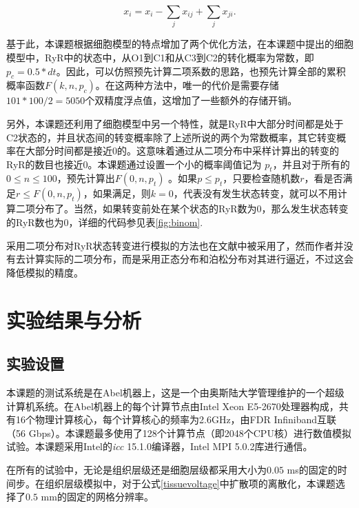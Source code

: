 \begin{equation}
\label{transitNumber}
x_i = x_i - \sum_{j}x_{ij}+\sum_{j}x_{ji}.
\end{equation}

基于此，本课题根据细胞模型的特点增加了两个优化方法，在本课题中提出的细胞模型中，RyR中的状态中，从O1到C1和从C3到C2的转化概率为常数，即$p_c=0.5*dt$。因此，可以仿照预先计算二项系数的思路，也预先计算全部的累积概率函数$F(k,n,p_c)$。在这两种方法中，唯一的代价是需要存储$101*100/2=5050$个双精度浮点值，这增加了一些额外的存储开销。

另外，本课题还利用了细胞模型中另一个特性，就是RyR中大部分时间都是处于C2状态的，并且状态间的转变概率除了上述所说的两个为常数概率，其它转变概率在大部分时间都是接近0的。这意味着通过从二项分布中采样计算出的转变的RyR的数目也接近0。本课题通过设置一个小的概率阈值记为 $p_t$，并且对于所有的$0 \leq n \leq 100$，预先计算出$F(0,n,p_t)$ 。如果$p \leq p_t$，只要检查随机数$r$，看是否满足$r \leq F(0,n,p_t)$，如果满足，则$k=0$，代表没有发生状态转变，就可以不用计算二项分布了。当然，如果转变前处在某个状态的RyR数为0，那么发生状态转变的RyR数也为0，详细的代码参见表\ref{fig:binom}.

采用二项分布对RyR状态转变进行模拟的方法也在文献中被采用了，然而作者并没有去计算实际的二项分布，而是采用正态分布和泊松分布对其进行逼近，不过这会降低模拟的精度。
   
   
\section{实验结果与分析}
\subsection{实验设置}

本课题的测试系统是在Abel机器上，这是一个由奥斯陆大学管理维护的一个超级计算机系统。在Abel机器上的每个计算节点由Intel Xeon E5-2670处理器构成，共有16个物理计算核心，每个计算核心的频率为2.6GHz，由FDR Infiniband互联（56 Gbps）。本课题最多使用了128个计算节点（即2048个CPU核）进行数值模拟试验。本课题采用Intel的\textit{icc} 15.1.0编译器，Intel MPI 5.0.2库进行通信。

在所有的试验中，无论是组织层级还是细胞层级都采用大小为$0.05$ ms的固定的时间步。在组织层级模拟中，对于公式\ref{tissuevoltage}中扩散项的离散化，本课题选择了$0.5$ mm的固定的网格分辨率。

